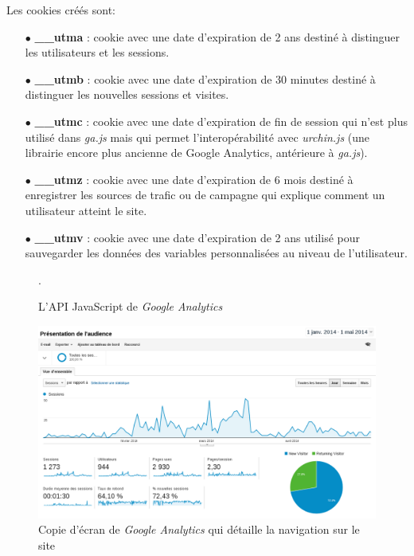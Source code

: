 Les cookies créés sont:
\begin{itemize}
  \item[$\bullet$] \textbf{\_\_utma} : cookie avec une date d'expiration de 2 ans destiné à distinguer les utilisateurs et les sessions.
  \item[$\bullet$] \textbf{\_\_utmb} : cookie avec une date d'expiration de 30 minutes destiné à distinguer les nouvelles sessions et visites.
  \item[$\bullet$] \textbf{\_\_utmc} : cookie avec une date d'expiration de fin de session qui n'est plus utilisé dans \textit{ga.js} mais qui permet l'interopérabilité avec \textit{urchin.js} (une librairie encore plus ancienne de Google Analytics, antérieure à \textit{ga.js}).
  \item[$\bullet$] \textbf{\_\_utmz} : cookie avec une date d'expiration de 6 mois destiné à enregistrer les sources de trafic ou de campagne qui explique comment un utilisateur atteint le site.
  \item[$\bullet$] \textbf{\_\_utmv} : cookie avec une date d'expiration de 2 ans utilisé pour sauvegarder les données des variables personnalisées au niveau de l'utilisateur.
\end{itemize}

\begin{figure}[h]
	\centering
	
	\caption{\label{js_google_analytics}L'API JavaScript de \textit{Google Analytics}}.
\end{figure}

\begin{figure}[h]
	\centering
	\includegraphics[scale=0.4]{examples/Google_Analytics_1.png}
	\caption{\label{Google_Analytics_1}Copie d'écran de \textit{Google Analytics} qui détaille la navigation sur le site}
\end{figure}


